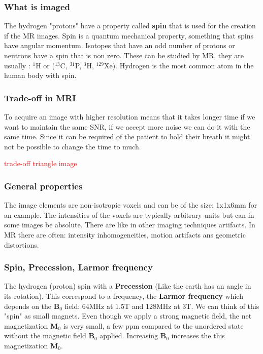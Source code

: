 		\subsubsection{What is imaged}
		The hydrogen "protons" have a property called \textbf{spin} that is used for the creation if the MR images. Spin is a quantum mechanical property, something that spins have angular momentum. Isotopes that have an odd number of protons or neutrons have a spin that is non zero. These can be studied by MR, they are usually : $^{1}$H or ($^{13}$C, $^{31}$P, $^{3}$H, $^{129}$Xe). Hydrogen is the most common atom in the human body with spin. 

		\subsubsection{Trade-off in MRI}
		To acquire an image with higher resolution means that it takes longer time if we want to maintain the same SNR, if we accept more noise we can do it with the same time. Since it can be required of the patient to hold their breath it might not be possible to change the time to much. 

		\textcolor{red}{trade-off triangle image}

		\subsubsection{General properties}
		The image elements are non-isotropic voxels and can be of the size: 1x1x6mm for an example. The intensities of the voxels are typically arbitrary units but can in some images be absolute. There are like in other imaging techniques artifacts. In MR there are often: intensity inhomogeneities, motion artifacts ans geometric distortions.

		
		\subsubsection{Spin, Precession, Larmor frequency}
		The hydrogen (proton) spin with a \textbf{Precession} (Like the earth has an angle in its rotation). This correspond to a frequency, the \textbf{Larmor frequency} which depends on the \textbf{B}$_0$ field: 64MHz at 1.5T and 128MHz at 3T. We can think of this "spin" as small magnets. Even though we apply a strong magnetic field, the net magnetization \textbf{M}$_0$ is very small, a few ppm compared to the unordered state without the magnetic field \textbf{B}$_0$ applied. Increasing \textbf{B}$_0$ increases the this magnetization \textbf{M}$_0$.

